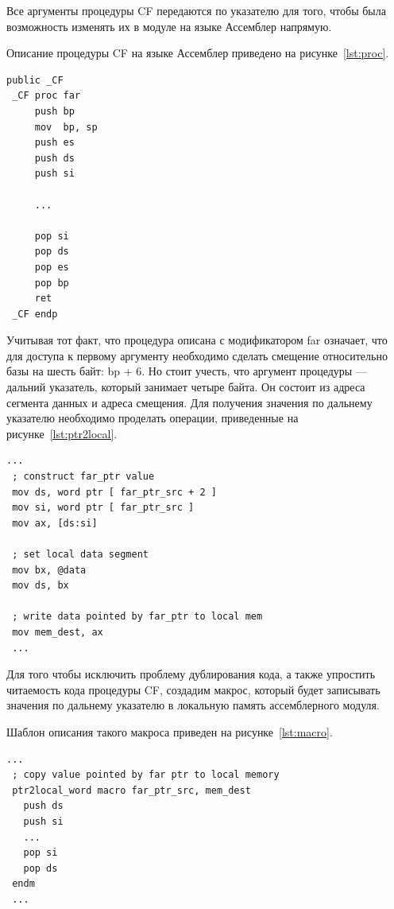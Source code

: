 Все аргументы процедуры CF передаются по указателю для того, чтобы была возможность
изменять их в модуле на языке Ассемблер напрямую.

\newpage
Описание процедуры CF на языке Ассемблер приведено на рисунке~\ref{lst:proc}.
\begin{lstlisting}[caption=Описание процедуры на языке Ассемблер,
label=lst:proc,language={[x86masm]Assembler},basicstyle=\scriptsize\ttfamily]
 public _CF
 _CF proc far
     push bp
     mov  bp, sp
     push es
     push ds
     push si

     ...

     pop si
     pop ds
     pop es
     pop bp
     ret
 _CF endp
\end{lstlisting}

Учитывая тот факт, что процедура описана с модификатором far означает, что для
доступа к первому аргументу необходимо сделать смещение относительно базы на
шесть байт: bp + 6. Но стоит учесть, что аргумент процедуры --- дальний указатель,
который занимает четыре байта. Он состоит из адреса сегмента данных и адреса смещения.
Для получения значения по дальнему указателю необходимо проделать операции,
приведенные на рисунке~\ref{lst:ptr2local}.
\begin{lstlisting}[label=lst:ptr2local,caption={Запись значения, получаемого
по дальнему указателю в локальную память},language={[x86masm]Assembler},basicstyle=\scriptsize\ttfamily]
 ...
 ; construct far_ptr value
 mov ds, word ptr [ far_ptr_src + 2 ]
 mov si, word ptr [ far_ptr_src ]
 mov ax, [ds:si]

 ; set local data segment
 mov bx, @data
 mov ds, bx

 ; write data pointed by far_ptr to local mem
 mov mem_dest, ax
 ...
\end{lstlisting}

Для того чтобы исключить проблему дублирования кода, а также упростить читаемость
кода процедуры CF, создадим макрос, который будет записывать значения по дальнему
указателю в локальную память ассемблерного модуля.

Шаблон описания такого макроса приведен на рисунке~\ref{lst:macro}.
\begin{lstlisting}[label=lst:macro,caption={Шаблон описания макроса, используемого
  для записи значения в локальную память по дальнему указателю},
  language={[x86masm]Assembler},basicstyle=\scriptsize\ttfamily]
 ...
 ; copy value pointed by far ptr to local memory
 ptr2local_word macro far_ptr_src, mem_dest
   push ds
   push si
   ...
   pop si
   pop ds
 endm
 ...
\end{lstlisting}

